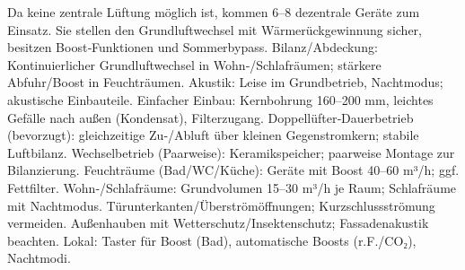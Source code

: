 \markdownRendererDocumentBegin
\markdownRendererSectionBegin
{}\markdownRendererInterblockSeparator
{}Da keine zentrale Lüftung möglich ist, kommen 6–8 dezentrale Geräte zum Einsatz. Sie stellen den Grundluftwechsel mit Wärmerückgewinnung sicher, besitzen Boost‑Funktionen und Sommerbypass.\markdownRendererInterblockSeparator
{}\markdownRendererSectionBegin
{}\markdownRendererInterblockSeparator
{}\markdownRendererUlBeginTight
\markdownRendererUlItem Bilanz/Abdeckung: Kontinuierlicher Grundluftwechsel in Wohn‑/Schlafräumen; stärkere Abfuhr/Boost in Feuchträumen.\markdownRendererUlItemEnd 
\markdownRendererUlItem Akustik: Leise im Grundbetrieb, Nachtmodus; akustische Einbauteile.\markdownRendererUlItemEnd 
\markdownRendererUlItem Einfacher Einbau: Kernbohrung 160–200 mm, leichtes Gefälle nach außen (Kondensat), Filterzugang.\markdownRendererUlItemEnd 
\markdownRendererUlEndTight \markdownRendererInterblockSeparator
{}
\markdownRendererSectionEnd \markdownRendererSectionBegin
{}\markdownRendererInterblockSeparator
{}\markdownRendererUlBeginTight
\markdownRendererUlItem Doppellüfter‑Dauerbetrieb (bevorzugt): gleichzeitige Zu‑/Abluft über kleinen Gegenstromkern; stabile Luftbilanz.\markdownRendererUlItemEnd 
\markdownRendererUlItem Wechselbetrieb (Paarweise): Keramikspeicher; paarweise Montage zur Bilanzierung.\markdownRendererUlItemEnd 
\markdownRendererUlEndTight \markdownRendererInterblockSeparator
{}
\markdownRendererSectionEnd \markdownRendererSectionBegin
{}\markdownRendererInterblockSeparator
{}\markdownRendererUlBeginTight
\markdownRendererUlItem Feuchträume (Bad/WC/Küche): Geräte mit Boost 40–60 m³/h; ggf. Fettfilter.\markdownRendererUlItemEnd 
\markdownRendererUlItem Wohn‑/Schlafräume: Grundvolumen 15–30 m³/h je Raum; Schlafräume mit Nachtmodus.\markdownRendererUlItemEnd 
\markdownRendererUlItem Türunterkanten/Überströmöffnungen; Kurzschlussströmung vermeiden.\markdownRendererUlItemEnd 
\markdownRendererUlItem Außenhauben mit Wetterschutz/Insektenschutz; Fassadenakustik beachten.\markdownRendererUlItemEnd 
\markdownRendererUlEndTight \markdownRendererInterblockSeparator
{}
\markdownRendererSectionEnd \markdownRendererSectionBegin
{}\markdownRendererInterblockSeparator
{}\markdownRendererUlBeginTight
\markdownRendererUlItem Lokal: Taster für Boost (Bad), automatische Boosts (r.F./CO₂), Nachtmodi.\markdownRendererUlItemEnd 
